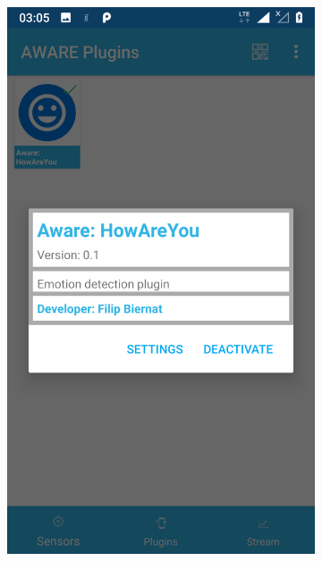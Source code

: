 \begin{figure}[H]
	\centering
	\begin{subfigure}{0.35\textwidth}
		\centering
		\includegraphics[scale=0.13]{rozdzial3/Ustawienia_uruchomienie.png}
		\subcaption{\label{subfigure_a}}
	\end{subfigure}
	\begin{subfigure}{0.35\textwidth}
		\centering

\end{subfigure}
\end{figure}
